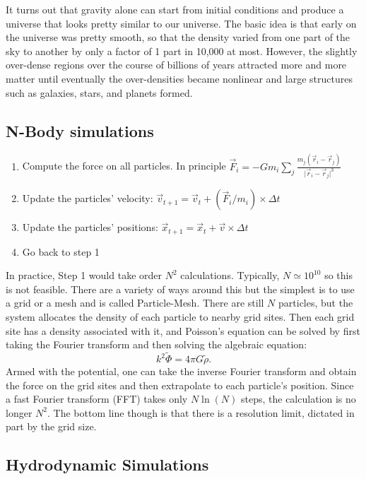\documentclass[prd,amsmath,aps,floats,amssymb, floatfix,
  superscriptaddress,nofootinbib]{revtex4-1}
\numberwithin{equation}{section}
\newcommand\be{\begin{equation}}
\newcommand\ee{\end{equation}}
\newcommand\bee{\begin{enumerate}}
\newcommand\eee{\end{enumerate}}
\begin{document}
It turns out that gravity alone can start from initial conditions and produce a universe that looks pretty similar to our universe. The basic idea is that early on the universe was pretty smooth, so that the density varied from one part of the sky to another by only a factor of 1 part in 10,000 at most. However, the slightly over-dense regions over the course of billions of years attracted more and more matter until eventually the over-densities became nonlinear and large structures such as galaxies, stars, and planets formed.

\subsection{N-Body simulations}

\bee
\item Compute the force on all particles. In principle $\vec F_i = -Gm_i\sum_j \frac{m_j (\vec r_i-\vec r_j)}{\vert \vec r_i-\vec r_j\vert^3}$
\item Update the particles' velocity: $\vec v_{t+1} = \vec v_t + (\vec F_i/m_i)\times \Delta t$
\item Update the particles' positions: $\vec x_{t+1} = \vec x_t + \vec v \times \Delta t$
\item Go back to step 1
\eee
In practice, Step 1 would take order $N^2$ calculations. Typically, $N\simeq 10^{10}$ so this is not feasible. There are a variety of ways around this but the simplest is to use a grid or a mesh and is called Particle-Mesh. There are still $N$ particles, but the system allocates the density of each particle to nearby grid sites. Then each grid site has a density associated with it, and Poisson's equation can be solved by first taking the Fourier transform and then solving the algebraic equation:
\be
k^2\tilde\Phi = 4\pi G \tilde\rho.\ee
Armed with the potential, one can take the inverse Fourier transform and obtain the force on the grid sites and then extrapolate to each particle's position. Since a fast Fourier transform (FFT) takes only $N\ln(N)$ steps, the calculation is no longer $N^2$. The bottom line though is that there is a resolution limit, dictated in part by the grid size.

\subsection{Hydrodynamic Simulations}
\end{document}
